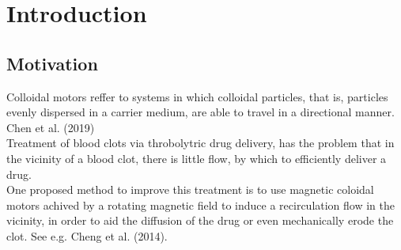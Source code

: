 \documentclass[12pt, DIV=12]{scrartcl}
\begin{document}

\newpage
\thispagestyle{empty}
\begin{abstract}
    \Large{\textbf{Abstract:}}

    \vspace{0.5cm}
    \normalsize
    This report presents work done in the 260035 LP Laboratory: Computational Statistical Mechanics, towards a larger project on recreating the experimental findings of Queiros Campos et al (2024) \cite{QueirosCampos2024} in simulation.

    The report includes two different methods of creating densly packed raspberry ellipsoid particles, as well as a qualitative analysis of the magnetic behaviour obtained by applying the Thermal Stoner-Wohlfarth model by Mostarac (2025) \cite{Mostarac2025} to them.

    !!! TODO

\end{abstract}

\newpage
{}
\tableofcontents	%

\newpage
\pagestyle{scrheadings}

\section{Introduction}

\subsection{Motivation}

Colloidal motors reffer to systems in which colloidal particles, that is, particles evenly dispersed in a carrier medium, are able to travel in a directional manner. Chen et al. (2019) \cite{Chen2019}\\
Treatment of blood clots via throbolytric drug delivery, has the problem that in the vicinity of a blood clot, there is little flow, by which to efficiently deliver a drug.\\
One proposed method to improve this treatment is to use magnetic coloidal motors achived by a rotating magnetic field to induce a recirculation flow in the vicinity, in order to aid the diffusion of the drug or even mechanically erode the clot. See e.g. Cheng et al. (2014). \cite{Cheng2014}
\end{document}
